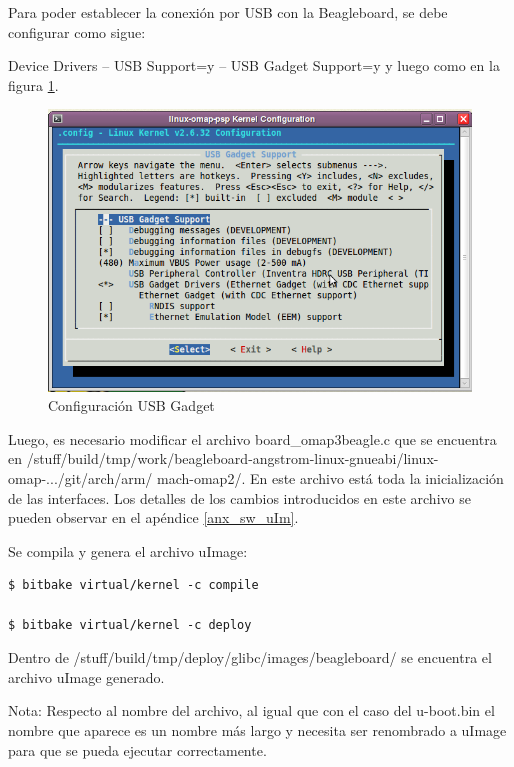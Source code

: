 \newpage
Para poder establecer la conexión por USB con la Beagleboard, se debe configurar como sigue: 

Device Drivers – USB Support=y – USB Gadget Support=y y luego como en la figura \ref{Fig:usb}.

\begin{figure}[H]
\centering
  \begin{center}
  \includegraphics[scale=.4]{Imagenes/usb_chica.png} 
  \end{center}
  \caption{Configuración USB Gadget}\label{Fig:usb} 
\end{figure}

Luego, es necesario modificar el archivo board\_omap3beagle.c que se encuentra en /stuff/build/tmp/work/beagleboard-angstrom-linux-gnueabi/linux-omap-.../git/arch/arm/
mach-omap2/. En este archivo está toda la inicialización de las interfaces. Los detalles de los cambios introducidos en este archivo se pueden observar en el apéndice \ref{anx_sw_uIm}.

\bigskip
Se compila y genera el archivo uImage:

\bigskip
\begin{verbatim}
$ bitbake virtual/kernel -c compile

$ bitbake virtual/kernel -c deploy
\end{verbatim}

\bigskip
Dentro de /stuff/build/tmp/deploy/glibc/images/beagleboard/ se encuentra el archivo uImage generado.

\bigskip
Nota: Respecto al nombre del archivo, al igual que con el caso del u-boot.bin el nombre que aparece es un nombre más largo y necesita ser renombrado a uImage para que se pueda ejecutar correctamente.

